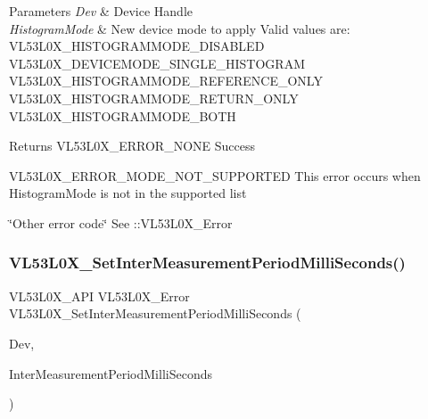 \begin{DoxyParams}{Parameters}
{\em Dev} & Device Handle \\
\hline
{\em Histogram\+Mode} & New device mode to apply Valid values are\+: V\+L53\+L0\+X\+\_\+\+H\+I\+S\+T\+O\+G\+R\+A\+M\+M\+O\+D\+E\+\_\+\+D\+I\+S\+A\+B\+L\+ED V\+L53\+L0\+X\+\_\+\+D\+E\+V\+I\+C\+E\+M\+O\+D\+E\+\_\+\+S\+I\+N\+G\+L\+E\+\_\+\+H\+I\+S\+T\+O\+G\+R\+AM V\+L53\+L0\+X\+\_\+\+H\+I\+S\+T\+O\+G\+R\+A\+M\+M\+O\+D\+E\+\_\+\+R\+E\+F\+E\+R\+E\+N\+C\+E\+\_\+\+O\+N\+LY V\+L53\+L0\+X\+\_\+\+H\+I\+S\+T\+O\+G\+R\+A\+M\+M\+O\+D\+E\+\_\+\+R\+E\+T\+U\+R\+N\+\_\+\+O\+N\+LY V\+L53\+L0\+X\+\_\+\+H\+I\+S\+T\+O\+G\+R\+A\+M\+M\+O\+D\+E\+\_\+\+B\+O\+TH\\
\hline
\end{DoxyParams}
\begin{DoxyReturn}{Returns}
V\+L53\+L0\+X\+\_\+\+E\+R\+R\+O\+R\+\_\+\+N\+O\+NE Success 

V\+L53\+L0\+X\+\_\+\+E\+R\+R\+O\+R\+\_\+\+M\+O\+D\+E\+\_\+\+N\+O\+T\+\_\+\+S\+U\+P\+P\+O\+R\+T\+ED This error occurs when Histogram\+Mode is not in the supported list 

\char`\"{}\+Other error code\char`\"{} See \+::\+V\+L53\+L0\+X\+\_\+\+Error 
\end{DoxyReturn}
\mbox{\label{group__VL53L0X__parameters__group_gac702606aaf8be1f7dc39a309997f28bc}} 
\subsubsection{\texorpdfstring{V\+L53\+L0\+X\+\_\+\+Set\+Inter\+Measurement\+Period\+Milli\+Seconds()}{VL53L0X\_SetInterMeasurementPeriodMilliSeconds()}}
{\footnotesize\ttfamily V\+L53\+L0\+X\+\_\+\+A\+PI V\+L53\+L0\+X\+\_\+\+Error V\+L53\+L0\+X\+\_\+\+Set\+Inter\+Measurement\+Period\+Milli\+Seconds (\begin{DoxyParamCaption}\item[{\hyperlink{group__VL53L0X__platform__group_ga2d6405308b1dd524b462f1b8fb97d167}{V\+L53\+L0\+X\+\_\+\+D\+EV}}]{Dev,  }\item[{\hyperlink{vl53l0x__types_8h_a435d1572bf3f880d55459d9805097f62}{uint32\+\_\+t}}]{Inter\+Measurement\+Period\+Milli\+Seconds }\end{DoxyParamCaption})}

